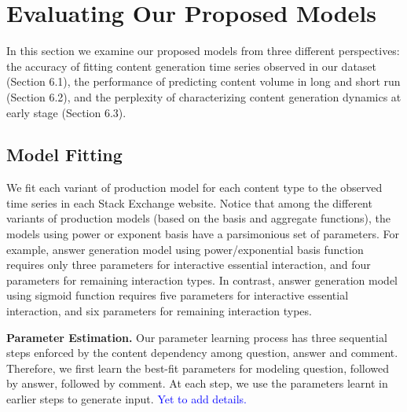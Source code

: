\section{Evaluating Our Proposed Models}
In this section we examine our proposed models from three different perspectives: the accuracy of fitting content generation time series observed in our dataset (Section 6.1), the performance of predicting content volume in long and short run (Section 6.2), and the perplexity of characterizing content generation dynamics at early stage (Section 6.3).

\subsection{Model Fitting}
We fit each variant of production model for each content type to the observed time series in each Stack Exchange website. Notice that among the different variants of production models (based on the basis and aggregate functions), the models using power or exponent basis have a parsimonious set of parameters. For example, answer generation model using power/exponential basis function requires only three parameters for interactive essential interaction, and four parameters for remaining interaction types. In contrast, answer generation model using sigmoid function requires five parameters for interactive essential interaction, and six parameters for remaining interaction types. 

\textbf{Parameter Estimation.} Our parameter learning process has three sequential steps enforced by the content dependency among question, answer and comment. Therefore, we first learn the best-fit parameters for modeling question, followed by answer, followed by comment. At each step, we use the parameters learnt in earlier steps to generate input. \textcolor{blue}{Yet to add details.}

